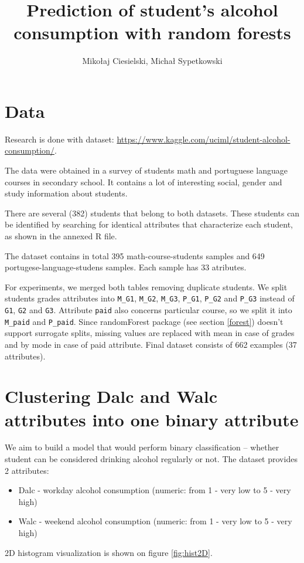 \documentclass[a4paper]{article}
\begin{document}
\title{Prediction of student's alcohol consumption with random forests}

\author{Mikołaj Ciesielski, Michał Sypetkowski}
\maketitle


\begin{multicols}{2}

\section{Data}

Research is done with dataset: \url{https://www.kaggle.com/uciml/student-alcohol-consumption/}.

The data were obtained in a survey of students
math and portuguese language courses in secondary school.
It contains a lot of interesting social,
gender and study information about students.

There are several (382) students that belong to both datasets.
These students can be identified by searching for identical attributes
that characterize each student, as shown in the annexed R file.

The dataset contains in total 395 math-course-students samples and 
649 portugese-language-studens samples. Each sample has 33 atributes.

For experiments, we merged both tables removing duplicate students.
We split students grades attributes into
\texttt{M\_G1},
\texttt{M\_G2},
\texttt{M\_G3},
\texttt{P\_G1},
\texttt{P\_G2} and
\texttt{P\_G3} instead of
\texttt{G1}, \texttt{G2} and \texttt{G3}.
Attribute \texttt{paid} also concerns particular course, so we split it into
\texttt{M\_paid} and \texttt{P\_paid}.
Since randomForest package (see section \ref{forest}) doesn't support surrogate splits,
missing values are replaced with mean in case of grades and by mode in case of paid attribute.
Final dataset consists of 662 examples (37 attributes).

\section{Clustering Dalc and Walc attributes into one binary attribute}
\label{clust}

We aim to build a model that would perform binary classification --
whether student can be considered drinking alcohol regularly or not.
The dataset provides 2 attributes:
\begin{itemize}
    \item Dalc - workday alcohol consumption (numeric: from 1 - very low to 5 - very high)
    \item Walc - weekend alcohol consumption (numeric: from 1 - very low to 5 - very high)
\end{itemize}
2D histogram visualization is shown on figure \ref{fig:hist2D}.


\end{multicols}
\end{document}
